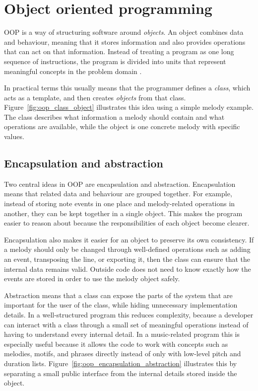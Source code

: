 \section{Object oriented programming}

  \ac{OOP} is a way of structuring software around \textit{objects}. An object combines data and behaviour, meaning that it stores information and also provides operations that can act on that information. Instead of treating a program as one long sequence of instructions, the program is divided into units that represent meaningful concepts in the problem domain \cite{ObjectorientedProgramming2026,JacobsonOOSE}.

  In practical terms this usually means that the programmer defines a \textit{class}, which acts as a template, and then creates \textit{objects} from that class. Figure~\ref{fig:oop_class_object} illustrates this idea using a simple melody example. The class describes what information a melody should contain and what operations are available, while the object is one concrete melody with specific values.

  

\subsection{Encapsulation and abstraction}

  Two central ideas in \ac{OOP} are encapsulation and abstraction. Encapsulation means that related data and behaviour are grouped together. For example, instead of storing note events in one place and melody-related operations in another, they can be kept together in a single object. This makes the program easier to reason about because the responsibilities of each object become clearer.

  Encapsulation also makes it easier for an object to preserve its own consistency. If a melody should only be changed through well-defined operations such as adding an event, transposing the line, or exporting it, then the class can ensure that the internal data remains valid. Outside code does not need to know exactly how the events are stored in order to use the melody object safely.

  Abstraction means that a class can expose the parts of the system that are important for the user of the class, while hiding unnecessary implementation details. In a well-structured program this reduces complexity, because a developer can interact with a class through a small set of meaningful operations instead of having to understand every internal detail. In a music-related program this is especially useful because it allows the code to work with concepts such as melodies, motifs, and phrases directly instead of only with low-level pitch and duration lists. Figure~\ref{fig:oop_encapsulation_abstraction} illustrates this by separating a small public interface from the internal details stored inside the object.

